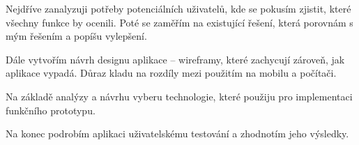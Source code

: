 Nejdříve zanalyzuji potřeby potenciálních uživatelů, kde se pokusím zjistit, které všechny funkce by ocenili. Poté se
zaměřím na existující řešení, která porovnám s mým řešením a popíšu vylepšení.

Dále vytvořím návrh designu aplikace -- wireframy, které zachycují zároveň, jak aplikace vypadá. Důraz kladu na rozdíly
mezi použitím na mobilu a počítači.

Na základě analýzy a návrhu vyberu technologie, které použiju pro implementaci funkčního prototypu.

Na konec podrobím aplikaci uživatelskému testování a zhodnotím jeho výsledky.
